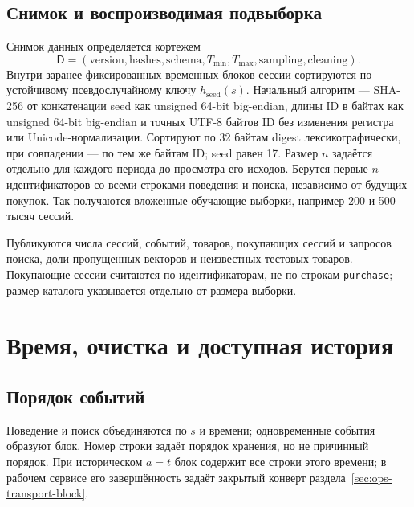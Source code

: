 \documentclass[12pt,a4paper]{article}
\newcommand{\code}[1]{{\ttfamily\small\nolinkurl{#1}}}
\theoremstyle{plainru}
\begin{document}
\subsection{Снимок и воспроизводимая подвыборка}

Снимок данных определяется кортежем
\begin{equation}\label{eq:data-snapshot}
\mathsf D=(\mathrm{version},\mathrm{hashes},\mathrm{schema},
T_{\min},T_{\max},\mathrm{sampling},\mathrm{cleaning}).
\end{equation}
Внутри заранее фиксированных временных блоков сессии сортируются
по устойчивому псевдослучайному ключу \(h_{\mathrm{seed}}(s)\).
Начальный алгоритм --- SHA-256 от конкатенации seed как unsigned
64-bit big-endian, длины ID в байтах как unsigned 64-bit big-endian
и точных UTF-8 байтов ID без изменения регистра или Unicode-нормализации.
Сортируют по 32 байтам digest лексикографически, при совпадении ---
по тем же байтам ID; seed равен 17. Размер $n$ задаётся отдельно
для каждого периода до просмотра его исходов.
Берутся первые \(n\) идентификаторов со всеми строками поведения и поиска,
независимо от будущих покупок. Так получаются вложенные обучающие выборки,
например 200 и 500 тысяч сессий.

Публикуются числа сессий, событий, товаров, покупающих сессий и запросов
поиска, доли пропущенных векторов и неизвестных тестовых товаров.
Покупающие сессии считаются по идентификаторам, не по строкам
\code{purchase}; размер каталога указывается отдельно от размера выборки.

\section{Время, очистка и доступная история}\label{sec:time}

\subsection{Порядок событий}

Поведение и поиск объединяются по \(s\) и времени; одновременные события
образуют блок. Номер строки задаёт порядок хранения, но не причинный порядок.
При историческом \(a=t\) блок содержит все строки этого времени;
в рабочем сервисе его завершённость задаёт закрытый конверт
раздела~\ref{sec:ops-transport-block}.
\end{document}
